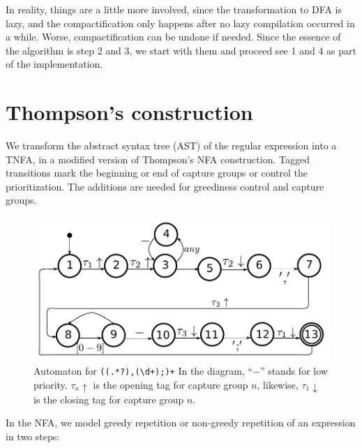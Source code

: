 \documentclass[11pt,a4paper,twoside,openright]{Thesis}
\theoremstyle{definition}
\newcommand{\seclabel}[1]{\label{sec:#1}}
\begin{document}
In reality, things are a little more involved, since the transformation
to DFA is lazy, and the compactification only happens after no lazy
compilation occurred in a while. Worse, compactification can be
undone if needed. Since the essence of the algorithm is step 2 and 3,
we start with them and proceed see 1 and 4 as part of the implementation.

\section{Thompson's construction} 	\seclabel{thompson}

We transform the abstract syntax tree (AST) of the regular expression into a
TNFA, in a modified version of Thompson's NFA construction. Tagged transitions
mark the beginning or end of capture groups or control the prioritization.  The
additions are needed for greediness control and capture groups.

\begin{figure}[htp]
\includegraphics[width=\linewidth]{graphs/lehrer_automaton}

\caption[NFA for \texttt{((.*?),(\textbackslash{}d+);)+}]{\label{fig:example-automaton}
Automaton for \texttt{((.*?),(\textbackslash{}d+);)+}
In the diagram, ``$-$'' stands for low priority. $\tau_n\uparrow$ is the
opening tag for capture group $n$, likewise, $\tau_1\downarrow$ is the closing
tag for capture group $n$.}
\end{figure}

In the NFA, we model greedy repetition or non-greedy repetition of
an expression in two steps:
\end{document}
